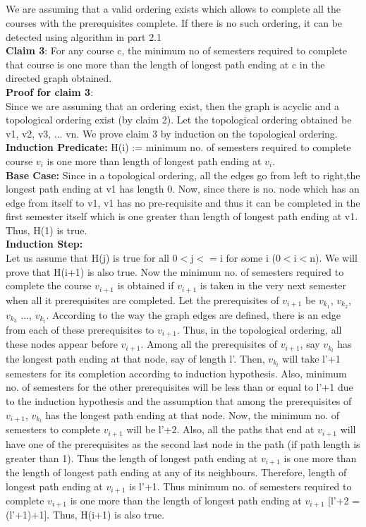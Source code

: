 \documentclass{article}
\begin{document}
\subsection{}
We are assuming that a valid ordering exists which allows to complete all the courses with the prerequisites complete. If there is no such ordering, it can be detected using algorithm in part 2.1\\
\textbf{Claim 3}: For any course c, the minimum no of semesters required to complete that course is one more than the length of longest path ending at c in the directed graph obtained.\\
\textbf{Proof for claim 3}:\\
Since we are assuming that an ordering exist, then the graph is acyclic and a topological ordering exist (by claim 2). Let the topological ordering obtained be v1, v2, v3, ... vn. We prove claim 3 by induction on the topological ordering.\\
\textbf{Induction Predicate:} H(i) := minimum no. of semesters required to complete course $v_i$ is one more than length of longest path ending at $v_i$.\\
\textbf{Base Case:} Since in a topological ordering, all the edges go from left to right,the longest path ending at v1 has length 0. Now, since there is no. node which has an edge from itself to v1, v1 has no pre-requisite and thus it can be completed in the first semester itself which is one greater than length of longest path ending at v1. Thus, H(1) is true.\\
\textbf{Induction Step:}\\
Let us assume that H(j) is true for all 0$<$j$<=$i for some i (0$<$i$<$n). We will prove that H(i+1) is also true. Now the minimum no. of semesters required to complete the course $v_{i+1}$ is obtained if $v_{i+1}$ is taken in the very next semester when all it prerequisites are completed. Let the prerequisites of $v_{i+1}$ be $v_{k_{1}}$, $v_{k_{2}}$, $v_{k_{3}}$ ..., $v_{k_{t}}$. According to the way the graph edges are defined, there is an edge from each of these prerequisites to $v_{i+1}$. Thus, in the topological ordering, all these nodes appear before $v_{i+1}$. Among all the prerequisites of $v_{i+1}$, say $v_{k_l}$ has the longest path ending at that node, say of length l'. Then, $v_{k_l}$ will take l'+1 semesters for its completion according to induction hypothesis. Also, minimum no. of semesters for the other prerequisites will be less than or equal to l'+1 due to the induction hypothesis and the assumption that among the prerequisites of $v_{i+1}$, $v_{k_l}$ has the longest path ending at that node. Now, the minimum no. of semesters to complete $v_{i+1}$ will be l'+2. Also, all the paths that end at $v_{i+1}$ will have one of the prerequisites as the second last node in the path (if path length is greater than 1). Thus the length of longest path ending at $v_{i+1}$ is one more than the length of longest path ending at any of its neighbours. Therefore, length of longest path ending at $v_{i+1}$ is l'+1. Thus minimum no. of semesters required to complete $v_{i+1}$ is one more than the length of longest path ending at $v_{i+1}$ [l'+2 = (l'+1)+1]. Thus, H(i+1) is also true.\\
\end{document}

